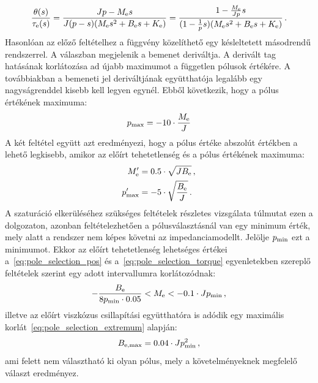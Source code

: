 \begin{align}
    \frac{\theta(s)}{\tau_{\mathrm{e}} (s)} = 
    \frac{Jp - M_{\mathrm{e}} s}{J(p-s)(M_{\mathrm{e}} s^2 + B_{\mathrm{e}} s + K_{\mathrm{e}})} = 
    \frac{1 -\frac{M_{\mathrm{e}}}{Jp} s}{(1-\frac{1}{p}s)(M_{\mathrm{e}} s^2 + B_{\mathrm{e}} s + K_{\mathrm{e}})}\,.
\end{align}
Hasonlóan az előző feltételhez a függvény közelíthető egy késleltetett másodrendű rendszerrel. A válaszban 
megjelenik a bemenet deriváltja. A derivált tag hatásának korlátozása ad újabb maximumot a független pólusok értékére. A 
továbbiakban a bemeneti jel deriváltjának együtthatója legalább egy nagyságrenddel kisebb kell legyen egynél.
Ebből következik, hogy a pólus értékének maximuma:
\begin{align}\label{eq:pole_selection_torque}
    p_{\mathrm{max}} = -10 \cdot \frac{M_{\mathrm{e}}}{J}
\end{align}
A két feltétel együtt azt eredményezi, hogy a pólus értéke abszolút értékben a lehető legkisebb, amikor
az előírt tehetetlenség és a pólus értékének maximuma:
\begin{equation}\label{eq:pole_selection_extremum}
    \begin{split}
        M'_{\mathrm{e}} &= 0.5 \cdot \sqrt{JB_{\mathrm{e}}}\,, \\
        p'_{\mathrm{max}} &= -5 \cdot \sqrt{\frac{B_{\mathrm{e}}}{J}}\,.
    \end{split}
\end{equation}
A szaturáció elkerüléséhez szükséges feltételek részletes vizsgálata túlmutat ezen a dolgozaton, azonban feltételezhetően 
a pólusválasztásnál van egy minimum érték, mely alatt a rendszer nem képes követni az impedanciamodellt. Jelölje \(p_{\mathrm{min}}\) ezt a 
minimumot. Ekkor az előírt tehetetlenség lehetséges értékei a~\eqref{eq:pole_selection_pos} és a~\eqref{eq:pole_selection_torque} 
egyenletekben szereplő feltételek szerint egy adott intervallumra korlátozódnak:
\begin{align}
    -\frac{B_{\mathrm{e}}}{8p_{\mathrm{min}} \cdot 0.05} < M_{\mathrm{e}} < -0.1 \cdot Jp_{\mathrm{min}}\,,
\end{align}
illetve az előírt viszkózus csillapítási együtthatóra is adódik egy maximális korlát~\eqref{eq:pole_selection_extremum} alapján:
\begin{align}
    B_{\mathrm{e,max}} = 0.04 \cdot Jp^2_{\mathrm{min}}\,,
\end{align}
ami felett nem választható ki olyan pólus, mely a követelményeknek megfelelő választ eredményez. 
